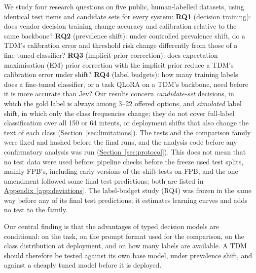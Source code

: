 We study four research questions on five public, human-labelled datasets, using identical test items and
candidate sets for every system:
\textbf{RQ1} (decision training): does vendor decision training change accuracy and calibration relative to the same
backbone?
\textbf{RQ2} (prevalence shift): under controlled prevalence shift, do a TDM's calibration error and threshold risk
change differently from those of a fine-tuned classifier?
\textbf{RQ3} (implicit-prior correction): does expectation--maximisation (EM) prior correction with the implicit
prior reduce a TDM's calibration error under shift?
\textbf{RQ4} (label budgets): how many training labels does a fine-tuned classifier, or a task QLoRA on a TDM's
backbone, need before it is more accurate than Jev?
Our results concern \emph{candidate-set} decisions, in which the gold label is always among 3--22 offered options, and
\emph{simulated} label shift, in which only the class frequencies change; they do not cover full-label classification
over all 150 or 64 intents, or deployment shifts that also change the text of each class (\hyperref[sec:limitations]{Section~\ref*{sec:limitations}}).
The tests and the comparison family were fixed and hashed before the final runs, and the analysis code before any
confirmatory analysis was run (\hyperref[sec:protocol]{Section~\ref*{sec:protocol}}). This does not mean that no test
data were used before: pipeline checks before the freeze used test splits, mainly FPB's, including early versions of
the shift tests on FPB, and the one amendment followed some final test predictions; both are listed in
\hyperref[app:deviations]{Appendix~\ref*{app:deviations}}. The label-budget study (RQ4) was frozen in the same way
before any of its final test predictions; it estimates learning curves and adds no test to the family.

Our central finding is that the advantages of typed decision models are conditional: on the task, on the prompt
format used for the comparison, on the class distribution at deployment, and on how many labels are available. A
TDM should therefore be tested against its own base model, under prevalence shift, and against a cheaply tuned model
before it is deployed.

